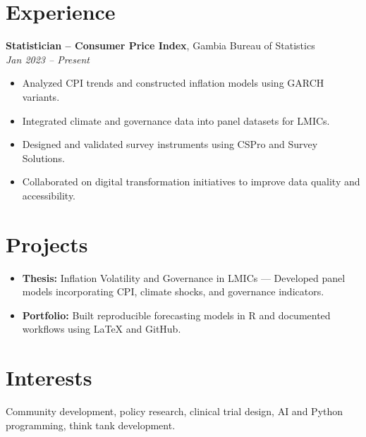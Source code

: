 \documentclass[11pt]{article}
\begin{document}
\section*{Experience}
\textbf{Statistician – Consumer Price Index}, Gambia Bureau of Statistics \\
\textit{Jan 2023 – Present}
\begin{itemize}[leftmargin=*]
    \item Analyzed CPI trends and constructed inflation models using GARCH variants.
    \item Integrated climate and governance data into panel datasets for LMICs.
    \item Designed and validated survey instruments using CSPro and Survey Solutions.
    \item Collaborated on digital transformation initiatives to improve data quality and accessibility.
\end{itemize}

\section*{Projects}
\begin{itemize}[leftmargin=*]
    \item \textbf{Thesis:} Inflation Volatility and Governance in LMICs — Developed panel models incorporating CPI, climate shocks, and governance indicators.
    \item \textbf{Portfolio:} Built reproducible forecasting models in R and documented workflows using LaTeX and GitHub.
\end{itemize}

\section*{Interests}
Community development, policy research, clinical trial design, AI and Python programming, think tank development.
\end{document}
